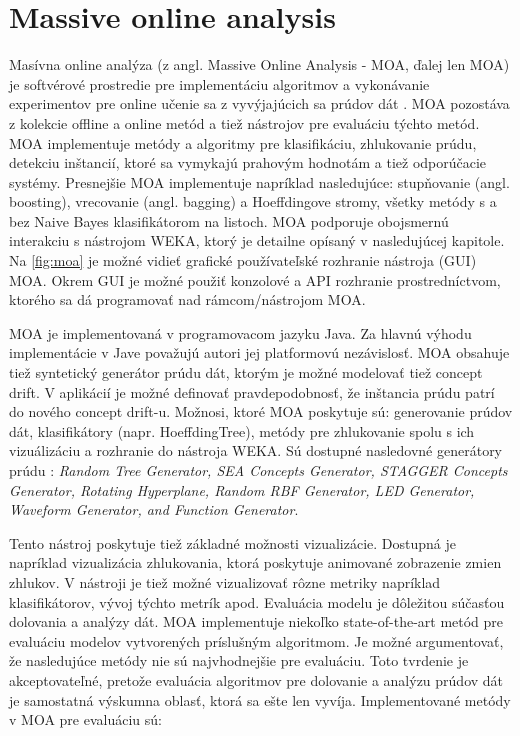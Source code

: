 \section{Massive online analysis}
Masívna online analýza (z angl. Massive Online Analysis - MOA, ďalej len MOA) je softvérové prostredie pre implementáciu algoritmov a vykonávanie experimentov pre online učenie sa z vyvýjajúcich sa prúdov dát \citep{DBLP:journals/jmlr/BifetHKP10}. MOA pozostáva z kolekcie offline a online metód a tiež nástrojov pre evaluáciu týchto metód. MOA implementuje metódy a algoritmy pre klasifikáciu, zhlukovanie prúdu, detekciu inštancií, ktoré sa vymykajú prahovým hodnotám a tiež odporúčacie systémy. Presnejšie MOA implementuje napríklad nasledujúce: stupňovanie (angl. boosting), vrecovanie (angl. bagging) a Hoeffdingove stromy, všetky metódy s a bez Naive Bayes klasifikátorom na listoch. MOA podporuje obojsmernú interakciu s nástrojom WEKA, ktorý je detailne opísaný v nasledujúcej kapitole. Na \ref{fig:moa} je možné vidieť grafické používateľské rozhranie nástroja (GUI) MOA. Okrem GUI je možné použiť konzolové a API rozhranie prostredníctvom, ktorého sa dá programovať nad rámcom/nástrojom MOA.
\par
MOA je implementovaná v programovacom jazyku Java. Za hlavnú výhodu implementácie v Jave považujú autori jej platformovú nezávislosť. MOA obsahuje tiež syntetický generátor prúdu dát, ktorým je možné modelovať tiež concept drift. V aplikácií je možné definovať pravdepodobnosť, že inštancia prúdu patrí do nového concept drift-u. Možnosi, ktoré MOA poskytuje sú: generovanie prúdov dát, klasifikátory (napr. HoeffdingTree), metódy pre zhlukovanie spolu s ich vizuálizáciu a rozhranie do nástroja WEKA. Sú dostupné nasledovné generátory prúdu \citep{DBLP:journals/jmlr/BifetHKP10}: \textit{Random Tree Generator, SEA Concepts Generator, STAGGER Concepts Generator, Rotating Hyperplane, Random RBF Generator, LED Generator, Waveform Generator, and Function Generator}.
\par
Tento nástroj poskytuje tiež základné možnosti vizualizácie. Dostupná je napríklad vizualizácia zhlukovania, ktorá poskytuje animované zobrazenie zmien zhlukov. V nástroji je tiež možné vizualizovať rôzne metriky napríklad klasifikátorov, vývoj týchto metrík apod.
\label{fig:moa}
Evaluácia modelu je dôležitou súčasťou dolovania a analýzy dát. MOA implementuje niekoľko state-of-the-art metód pre evaluáciu modelov vytvorených príslušným algoritmom. Je možné argumentovať, že nasledujúce metódy nie sú najvhodnejšie pre evaluáciu. Toto tvrdenie je akceptovateľné, pretože evaluácia algoritmov pre dolovanie a analýzu prúdov dát je samostatná výskumna oblasť, ktorá sa ešte len vyvíja. Implementované metódy v MOA pre evaluáciu sú:
